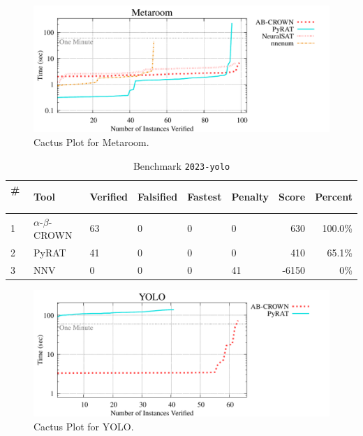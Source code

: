 \begin{figure}[h]
\centerline{\includegraphics[width=\textwidth]{cactus/2023_metaroom.pdf}}
\caption{Cactus Plot for Metaroom.}
\label{fig:quantPic}
\end{figure}



\begin{table}[h]
\begin{center}
\caption{Benchmark \texttt{2023-yolo}} \label{tab:cat_{cat}}
{\setlength{\tabcolsep}{2pt}
\begin{tabular}[h]{@{}llllllrr@{}}
\toprule
\textbf{\# ~} & \textbf{Tool} & \textbf{Verified} & \textbf{Falsified} & \textbf{Fastest} & \textbf{Penalty} & \textbf{Score} & \textbf{Percent}\\
\midrule
1 & $\alpha$-$\beta$-CROWN & 63 & 0 & 0 & 0 & 630 & 100.0\% \\
2 & PyRAT & 41 & 0 & 0 & 0 & 410 & 65.1\% \\
3 & NNV & 0 & 0 & 0 & 41 & -6150 & 0\% \\
\bottomrule
\end{tabular}
}
\end{center}
\end{table}



\begin{figure}[h]
\centerline{\includegraphics[width=\textwidth]{cactus/2023_yolo.pdf}}
\caption{Cactus Plot for YOLO.}
\label{fig:quantPic}
\end{figure}

